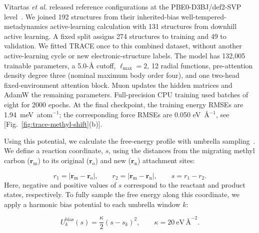 \documentclass[aps,prx,preprint,notitlepage,superscriptaddress,nofootinbib,floatfix]{revtex4-2}
\newcommand{\vect}[1]{\bm{#1}}
\newif\ifshowrevisions
\begin{document}
Vitartas \emph{et al.} released reference configurations at the PBE0-D3BJ/def2-SVP level~\cite{vitartas2026}. We joined 192 structures from their inherited-bias well-tempered-metadynamics active-learning calculation with 131 structures from downhill active learning. A fixed split assigns 274 structures to training and 49 to validation. We fitted TRACE once to this combined dataset, without another active-learning cycle or new electronic-structure labels. The model has 132,005 trainable parameters, a 5.0-\AA{} cutoff, $\ell_{\max}=2$, 12 radial functions, pre-attention density degree three (nominal maximum body order four), and one two-head fixed-environment attention block. Muon updates the hidden matrices and AdamW the remaining parameters. Full-precision CPU training used batches of eight for 2000 epochs. At the final checkpoint, the training energy RMSEs are 1.94~meV~atom$^{-1}$; the corresponding force RMSEs are 0.050 eV~\AA$^{-1}$, see [Fig.~\ref{fig:trace-methyl-shift}(b)].

Using this potential, we calculate the free-energy profile with umbrella sampling~\cite{torrie1977}. We define a reaction coordinate, $s$, using the distances from the migrating methyl carbon ($\vect r_{\mathrm m}$) to its original ($\vect r_{\mathrm o}$) and new ($\vect r_{\mathrm n}$) attachment sites:
\begingroup
\ifshowrevisions\color{draftsevencolor}\fi
\begin{equation}
 r_1=\left|\vect r_{\mathrm m}-\vect r_{\mathrm o}\right|,
 \qquad
 r_2=\left|\vect r_{\mathrm m}-\vect r_{\mathrm n}\right|,
 \qquad
 s=r_1-r_2.
 \label{eq:methyl-shift-coordinate}
\end{equation}
\endgroup
Here, negative and positive values of $s$ correspond to the reactant and product states, respectively. To fully sample the free energy along this coordinate, we apply a harmonic bias potential to each umbrella window $k$:
\begingroup
\ifshowrevisions\color{draftsevencolor}\fi
\begin{equation}
 U_k^{\mathrm{bias}}(s)
 =\frac{\kappa}{2}\left(s-s_k\right)^2,
 \qquad \kappa=20~\mathrm{eV}\,\text{\AA}^{-2}.
 \label{eq:methyl-shift-umbrella}
\end{equation}
\endgroup
\end{document}
